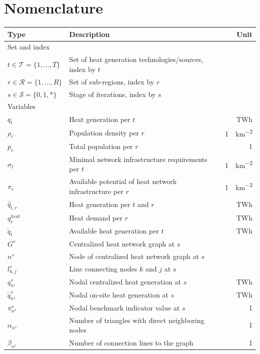 \documentclass[review]{elsarticle}
\begin{document}
\section*{Nomenclature}
\begin{center}
	\renewcommand{\arraystretch}{1.1}
	\centering
	\small
	\begin{tabular}{lm{8cm}r}
		Type & Description & Unit\\
		\hline
		Set and index & & \\
		\hline
		{$t \in \mathcal{T}=\{1,\ldots,T\}$} & Set of heat generation technologies/sources, index by $t$\\
		{$r \in \mathcal{R}=\{1,\ldots,R\}$} & Set of sub-regions, index by $r$\\
		{$s \in \mathcal{S}=\{0,1,*\}$} & Stage of iterations, index by $s$\\
		\hline
		Variables\\
		\hline
		{$q_{t}$} & Heat generation per $t$ & \SI{}{TWh}\\
		{$\rho_{r}$} & Population density per $r$ & \SI{}{1 \per \per km^2}\\
		{$p_{r}$} & Total population per $r$ & \SI{}{1}\\
		{$\sigma_{t}$} & Minimal network infrastructure requirements per $t$& \SI{}{1 \per \per km^2}\\
		{$\pi_{r}$} & Available potential of heat network infrastructure per $r$& \SI{}{1 \per \per km^2}\\
		{$\hat{q}_{t,r}$} & Heat generation per $t$ and $r$& \SI{}{TWh}\\
		{$q^{heat}_{r}$} & Heat demand per $r$& \SI{}{TWh}\\
		{$\tilde{q}_{t}$} & Available heat generation per $t$& \SI{}{TWh}\\
		{$G^{s}$} & Centralized heat network graph at $s$ & \\
		{$n^{s}$} & Node of centralized heat network graph at $s$ & \\
		{$l^{s}_{k,j}$} & Line connecting nodes $k$ and $j$ at $s$ & \\
		{$q^{s}_{n^{s}}$} & Nodal centralized heat generation at $s$ & \SI{}{TWh}\\
		{$\tilde{q}^{s}_{n^{s}}$} & Nodal on-site heat generation at $s$ & \SI{}{TWh}\\
		{$\pi^{s}_{n^{s}}$} & Nodal benchmark indicator value at $s$ & \SI{}{1}\\
		{$\alpha_{n^{s}}$} & Number of triangles with direct neighboring nodes & \SI{}{1}\\
		{$\beta_{n^{s}}$} & Number of connection lines to the graph & \SI{}{1}\\		
		\hline
	\end{tabular}
\end{center}
\newpage
\end{document}

